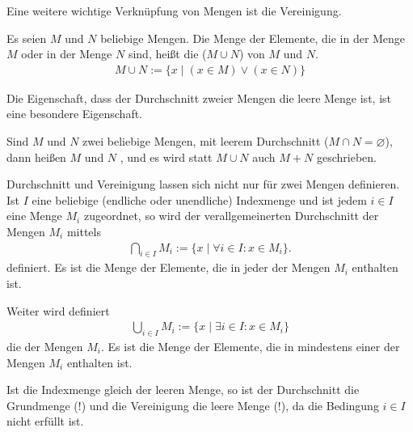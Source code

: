\begin{Unit}
Eine weitere wichtige Verknüpfung von Mengen ist die Vereinigung.

\begin{Definition}
  Es seien $M$ und $N$ beliebige Mengen. 
  Die Menge der Elemente, die in der Menge $M$ oder in der Menge $N$ sind, 
  heißt die  ($M \cup N$) von $M$ und $N$.
  \begin{align}
    M \cup N := \{ x \mid (x \in M) \lor (x \in N) \}
  \end{align}
\end{Definition}
\end{Unit}

\begin{Unit}
Die Eigenschaft, dass der Durchschnitt zweier Mengen die leere Menge ist, ist
eine besondere Eigenschaft.
 
\begin{Definition}
  Sind $M$ und $N$ zwei beliebige Mengen, mit leerem Durchschnitt ($M \cap N
  = \varnothing$), dann heißen $M$ und $N$ , und es wird 
  statt $M \cup N$ auch $M + N$ geschrieben.
\end{Definition}
\end{Unit}


\begin{Unit}[Anmerkung]
Durchschnitt und Vereinigung lassen sich nicht nur für zwei Mengen definieren. 
Ist $I$ eine beliebige (endliche oder unendliche) Indexmenge und ist jedem $i 
\in I$ eine Menge $M_i$ zugeordnet, so wird der \Begriff
{verallgemeinerten Durchschnitt} der Mengen $M_i$ mittels
\begin{align}
  \bigcap_{i \in I} M_i := \{ x \mid \forall i \in I: x \in M_i \} .
\end{align}
definiert.
Es ist die Menge der Elemente, die in jeder der Mengen $M_i$ enthalten ist.

Weiter wird definiert
\begin{align}
  \bigcup_{i \in I} M_i := \{x \mid \exists i \in I: x \in M_i \}
\end{align} die  der Mengen $M_i$. 
Es ist die Menge der Elemente, die in mindestens einer der Mengen $M_i$ 
enthalten ist.

Ist die Indexmenge gleich der leeren Menge, so ist der Durchschnitt die 
Grundmenge (!) und die Vereinigung die leere Menge (!), da die Bedingung 
$i \in I$ nicht erfüllt ist.
\end{Unit}

